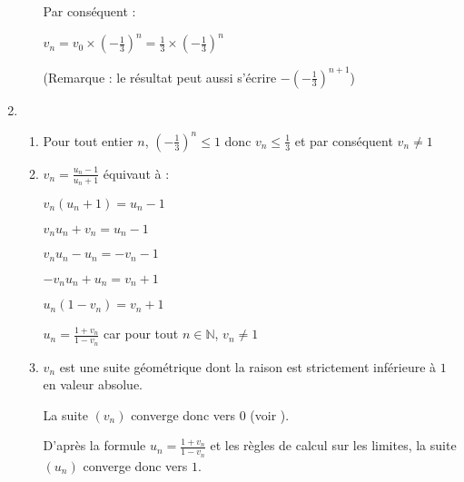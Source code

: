 \begin{corrige}
\begin{enumerate}
\begin{enumerate}
               Par conséquent :
               \par
               $v_{n}=v_{0}\times \left(-\frac{1}{3}\right)^{n}=\frac{1}{3}\times \left(-\frac{1}{3}\right)^{n}$
               \par
               (Remarque : le résultat peut aussi s'écrire $-\left(-\frac{1}{3}\right)^{n+1}$)
          \end{enumerate}
          \item
          \begin{enumerate}
               \item
               Pour tout entier $n$, $\left(-\frac{1}{3}\right)^{n} \leqslant  1$ donc $v_{n} \leqslant  \frac{1}{3}$ et par conséquent $v_{n}\neq 1$
               \item
               $v_{n}=\frac{u_{n}-1}{u_{n}+1}$ équivaut à :
               \par
               $v_{n}\left(u_{n}+1\right)=u_{n}-1$
               \par
               $v_{n}u_{n}+v_{n}=u_{n}-1$
               \par
               $v_{n}u_{n}-u_{n}=-v_{n}-1$
               \par
               $-v_{n}u_{n}+u_{n}=v_{n}+1$
               \par
               $u_{n}\left(1-v_{n}\right)=v_{n}+1$
               \par
               $u_{n}=\frac{1+v_{n}}{1-v_{n}}$ car pour tout $n \in  \mathbb{N}$, $v_{n}\neq 1$
               \item
               $v_{n}$ est une suite géométrique dont la raison est strictement inférieure à $1$ en valeur absolue.
               \par
               La suite $\left(v_{n}\right)$ converge donc vers $0$ (voir ).
               \par
               D'après la formule $u_{n}=\frac{1+v_{n}}{1-v_{n}}$ et les règles de calcul sur les limites, la suite $\left(u_{n}\right)$ converge donc vers $1$.
          \end{enumerate}
     \end{enumerate}
\end{corrige}
